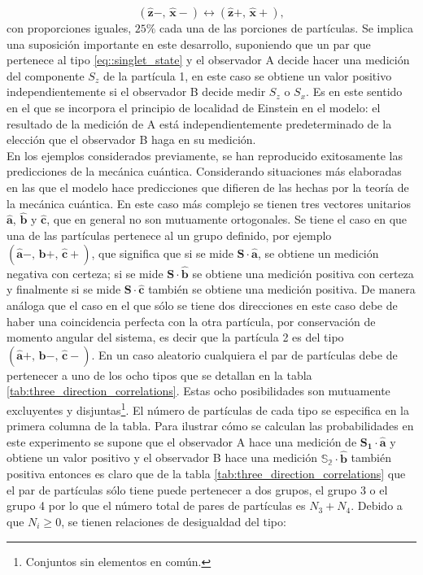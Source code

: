 \documentclass[a4paper]{article}
\begin{document}
\begin{equation}
(\mathbf{\hat{z}}-,\, \mathbf{\hat{x}}-) \leftrightarrow (\mathbf{\hat{z}}+,\, \mathbf{\hat{x}}+),
\end{equation}
con proporciones iguales, $25\%$ cada una de las porciones de partículas. Se implica una suposición importante en este desarrollo, suponiendo que un par que pertenece al tipo \ref{eq::singlet_state} y el observador A decide hacer una medición del componente $S_z$ de la partícula 1, en este caso se obtiene un  valor positivo independientemente si el observador B decide medir $S_z$ o $S_x$. Es en este sentido en el que se incorpora el principio de localidad de Einstein en el modelo: el resultado de la medición de A está independientemente predeterminado de la elección que el observador B haga en su medición.\\
En los ejemplos considerados previamente, se han reproducido exitosamente las predicciones de la mecánica cuántica. Considerando situaciones más elaboradas en las que el modelo hace predicciones que difieren de las hechas por la teoría de la mecánica cuántica. En este caso más complejo se tienen tres vectores unitarios $\mathbf{\hat{a}}$, $\mathbf{\hat{b}}$ y $\mathbf{\hat{c}}$, que en general no son mutuamente ortogonales. Se tiene el caso en que una de las partículas pertenece al un grupo definido, por ejemplo $(\mathbf{\hat{a}}-,\, \mathbf{\hat{b}}+,\,\mathbf{\hat{c}}+)$, que significa que si se mide $\mathbf{S}\cdot \mathbf{\hat{a}}$, se obtiene un medición negativa con certeza; si se mide $\mathbf{S}\cdot \mathbf{\hat{b}}$ se obtiene una medición positiva con certeza y finalmente si se mide $\mathbf{S}\cdot \mathbf{\hat{c}}$ también se obtiene una medición positiva. De manera análoga que el caso en el que sólo se tiene dos direcciones en este caso debe de haber una coincidencia perfecta con la otra partícula, por conservación de momento angular del sistema, es decir que la partícula 2 es del tipo $(\mathbf{\hat{a}}+,\, \mathbf{\hat{b}}-,\,\mathbf{\hat{c}}-)$. En un caso aleatorio cualquiera el par de partículas debe de pertenecer a uno de los ocho tipos que se detallan en la tabla \ref{tab:three_direction_correlations}. Estas ocho posibilidades son mutuamente excluyentes y disjuntas\footnote{Conjuntos sin elementos en común.}. El número de partículas de cada tipo se especifica en la primera columna de la tabla. Para ilustrar cómo se calculan las probabilidades en este experimento se supone que el observador A hace una medición de $\mathbf{S_1}\cdot \mathbf{\hat{a}}$ y obtiene un valor positivo y el observador B hace una medición $\mathbb{S_2}\cdot \mathbf{\hat{b}}$ también positiva entonces es claro que de la tabla \ref{tab:three_direction_correlations} que el par de partículas sólo tiene puede pertenecer a dos grupos, el grupo 3 o el grupo 4 por lo que el número total de pares de partículas es $N_3 + N_4$. Debido a que $N_i\geq 0$, se tienen relaciones de desigualdad del tipo:
\end{document}
